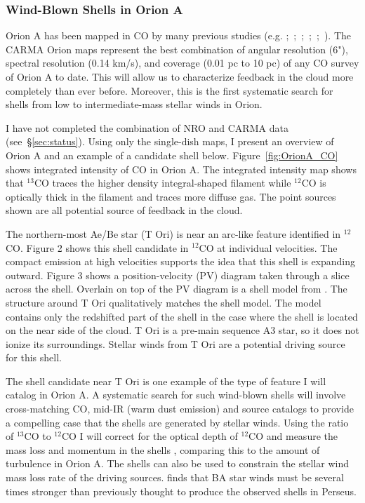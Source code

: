         \subsubsection{Wind-Blown Shells in Orion A}\label{sec:paper1}
Orion A has been mapped in CO by many previous studies (e.g. \citet{Bally87};~\citet{Wilson05};~\citet{Shimajiri11};~\citet{Buckle12};~\citet{Berne14};~\citet{Nishimura15}). The CARMA Orion maps represent the best combination of angular resolution (6"), spectral resolution (0.14 km/s), and coverage (0.01 pc to 10 pc) of any CO survey of Orion A to date. This will allow us to characterize feedback in the cloud more completely than ever before. Moreover, this is the first systematic search for shells from low to intermediate-mass stellar winds in Orion.
        
I have not completed the combination of NRO and CARMA data (see~\S\ref{sec:status}). Using only the single-dish maps, I present an overview of Orion A and an example of a candidate shell below. Figure~\ref{fig:OrionA_CO} shows integrated intensity of CO in Orion A. The integrated intensity map shows that $^{13}$CO traces the higher density integral-shaped filament while $^{12}$CO is optically thick in the filament and traces more diffuse gas. The point sources shown are all potential source of feedback in the cloud.

The northern-most Ae/Be star (T Ori) is near an arc-like feature identified in $^{12}$CO. Figure 2 shows this shell candidate in $^{12}$CO at individual velocities. The compact emission at high velocities supports the idea that this shell is expanding outward. Figure 3 shows a position-velocity (PV) diagram taken through a slice across the shell. Overlain on top of the PV diagram is a shell model from \citet{Arce_2011}. The structure around T Ori qualitatively matches the shell model. The model contains only the redshifted part of the shell in the case where the shell is located on the near side of the cloud.  T Ori is a pre-main sequence A3 star, so it does not ionize its surroundings. Stellar winds from T Ori are a potential driving source for this shell.

The shell candidate near T Ori is one example of the type of feature I will catalog in Orion A. A systematic search for such wind-blown shells will involve cross-matching CO, mid-IR (warm dust emission) and source catalogs to provide a compelling case that the shells are generated by stellar winds. Using the ratio of $^{13}$CO to $^{12}$CO I will correct for the optical depth of $^{12}$CO and measure the mass loss and momentum in the shells \cite{Arce_2011}, comparing this to the amount of turbulence in Orion A. The shells can also be used to constrain the stellar wind mass loss rate of the driving sources. \citet{Offner15} finds that BA star winds must be several times stronger than previously thought to produce the observed shells in Perseus.
